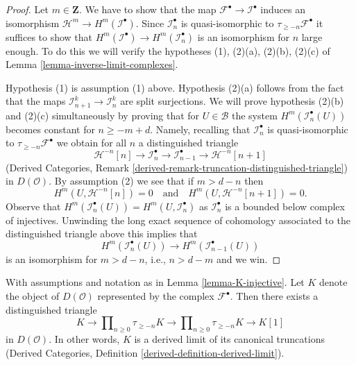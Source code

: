 \begin{proof}
Let $m \in \mathbf{Z}$.
We have to show that the map $\mathcal{F}^\bullet \to \mathcal{I}^\bullet$
induces an isomorphism $\mathcal{H}^m \to H^m(\mathcal{I}^\bullet)$.
Since $\mathcal{I}_n^\bullet$ is quasi-isomorphic to
$\tau_{\geq -n}\mathcal{F}^\bullet$ it suffices to show that
$H^m(\mathcal{I}^\bullet) \to H^m(\mathcal{I}_n^\bullet)$
is an isomorphism for $n$ large enough. To do this we will verify the
hypotheses (1), (2)(a), (2)(b), (2)(c) of
Lemma \ref{lemma-inverse-limit-complexes}.

\medskip\noindent
Hypothesis (1) is assumption (1) above. Hypothesis (2)(a) follows
from the fact that the maps $\mathcal{I}_{n + 1}^k \to \mathcal{I}_n^k$
are split surjections. We will prove hypothesis (2)(b) and (2)(c)
simultaneously by proving that for $U \in \mathcal{B}$ the system
$H^m(\mathcal{I}_n^\bullet(U))$ becomes constant for $n \geq -m + d$.
Namely, recalling that $\mathcal{I}_n^\bullet$ is quasi-isomorphic
to $\tau_{\geq -n}\mathcal{F}^\bullet$ we obtain for all $n$
a distinguished triangle
$$
\mathcal{H}^{-n}[n] \to \mathcal{I}_n^\bullet \to
\mathcal{I}_{n - 1}^\bullet \to \mathcal{H}^{-n}[n + 1]
$$
(Derived Categories, Remark
\ref{derived-remark-truncation-distinguished-triangle})
in $D(\mathcal{O})$. By assumption (2) we see that if $m > d - n$ then
$$
H^m(U, \mathcal{H}^{-n}[n]) = 0
\quad\text{and}\quad
H^m(U, \mathcal{H}^{-n}[n + 1]) = 0.
$$
Observe that $H^m(\mathcal{I}_n^\bullet(U)) = H^m(U, \mathcal{I}_n^\bullet)$
as $\mathcal{I}_n^\bullet$ is a bounded below complex of injectives.
Unwinding the long exact sequence of cohomology associated to the distinguished
triangle above this implies that
$$
H^m(\mathcal{I}_n^\bullet(U)) \to H^m(\mathcal{I}_{n - 1}^\bullet(U))
$$
is an isomorphism for $m > d - n$, i.e., $n > d - m$ and we win.
\end{proof}

\begin{lemma}
\label{lemma-is-limit}
With assumptions and notation as in Lemma \ref{lemma-K-injective}.
Let $K$ denote the object of $D(\mathcal{O})$ represented by
the complex $\mathcal{F}^\bullet$.
Then there exists a distinguished triangle
$$
K \to
\prod\nolimits_{n \geq 0} \tau_{\geq -n} K \to
\prod\nolimits_{n \geq 0} \tau_{\geq -n} K \to K[1]
$$
in $D(\mathcal{O})$. In other words, $K$ is a derived limit
of its canonical truncations
(Derived Categories, Definition \ref{derived-definition-derived-limit}).
\end{lemma}

